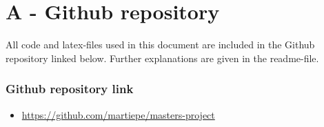 \appendix
\chapter*{A - Github repository}
\label{Appendix: github repo}

All code and latex-files used in this document are included in the Github repository linked below. Further explanations are given in the readme-file. 


\subsection*{Github repository link}
\begin{itemize}
    \item \url{https://github.com/martiepe/masters-project}
\end{itemize}


